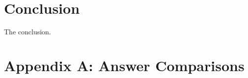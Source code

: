 \documentclass[fleqn,moreauthors,10pt]{ds_report}
\begin{document}

\section*{Conclusion}
The conclusion.









\clearpage


\appendix
\appendix
\section*{Appendix A: Answer Comparisons}
\label{appendix:a}
\end{document}
